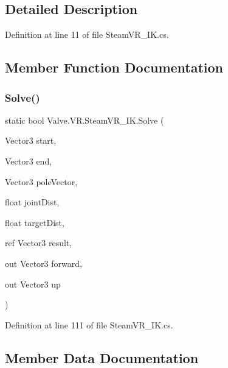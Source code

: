 \subsection{Detailed Description}


Definition at line 11 of file Steam\+V\+R\+\_\+\+I\+K.\+cs.



\subsection{Member Function Documentation}
\mbox{\label{class_valve_1_1_v_r_1_1_steam_v_r___i_k_acacd1e3c67856323c56dc189cc5e1285}} 
\subsubsection{\texorpdfstring{Solve()}{Solve()}}
{\footnotesize\ttfamily static bool Valve.\+V\+R.\+Steam\+V\+R\+\_\+\+I\+K.\+Solve (\begin{DoxyParamCaption}\item[{Vector3}]{start,  }\item[{Vector3}]{end,  }\item[{Vector3}]{pole\+Vector,  }\item[{float}]{joint\+Dist,  }\item[{float}]{target\+Dist,  }\item[{ref Vector3}]{result,  }\item[{out Vector3}]{forward,  }\item[{out Vector3}]{up }\end{DoxyParamCaption})\hspace{0.3cm}{\ttfamily [static]}}



Definition at line 111 of file Steam\+V\+R\+\_\+\+I\+K.\+cs.



\subsection{Member Data Documentation}
\mbox{\label{class_valve_1_1_v_r_1_1_steam_v_r___i_k_a142f297ba00068b83b2285f7cad44eea}} 

